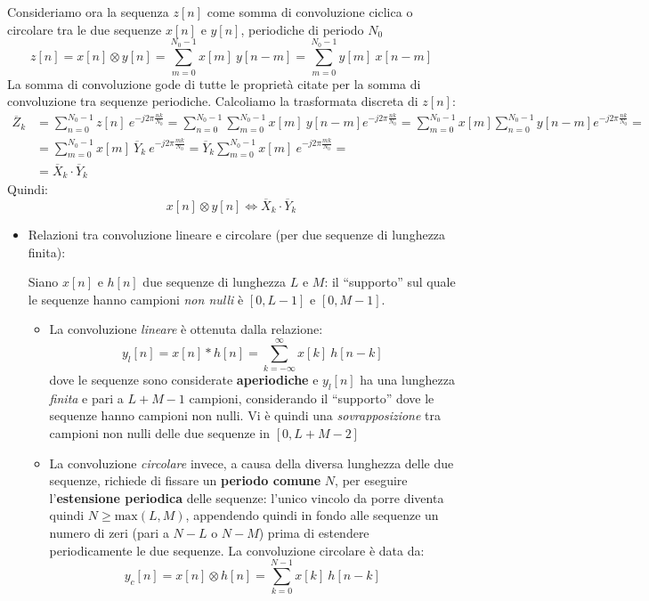 \documentclass[
]{article}
\providecommand{\tightlist}{%
  \setlength{\itemsep}{0pt}\setlength{\parskip}{0pt}}
\begin{document}
\begin{enumerate}
  Consideriamo ora la sequenza \(z[n]\) come somma di convoluzione
  ciclica o circolare tra le due sequenze \(x[n]\) e \(y[n]\),
  periodiche di periodo \(N_0\) \[
  z[n] = x[n] \otimes y[n] = \sum_{m=0}^{N_0 -1}x[m] \ y[n-m] = \sum_{m=0}^{N_0 -1}y[m] \ x[n-m]
  \] La somma di convoluzione gode di tutte le proprietà citate per la
  somma di convoluzione tra sequenze periodiche. \newline Calcoliamo la
  trasformata discreta di \(z[n]\): \begin{align*}
  \overline{Z}_k &= \sum_{n=0}^{N_0 -1} z[n] \ e^{-j2\pi{\frac{nk}{N_0}}} = \sum_{n=0}^{N_0 -1} \sum_{m=0}^{N_0 -1} x[m] \ y[n-m] e^{-j2\pi{\frac{nk}{N_0}}} = 
  \sum_{m=0}^{N_0 -1} x[m] \sum_{n=0}^{N_0 -1} y[n-m] e^{-j2\pi\frac{nk}{N_0}} = \\
  &= \sum_{m=0}^{N_0 -1} x[m] \ \overline{Y}_k \ e^{-j2\pi\frac{mk}{N_0}} = \overline{Y}_k \sum_{m=0}^{N_0 -1} x[m] \ e^{-j2\pi\frac{mk}{N_0}}= \\
  &= \overline{X}_k \cdot \overline{Y}_k
  \end{align*} Quindi: \[
  x[n]\otimes y[n] \Longleftrightarrow \overline{X}_k \cdot \overline{Y}_k
  \]

  \begin{itemize}
  \item
    Relazioni tra convoluzione lineare e circolare (per due sequenze di
    lunghezza finita):

    Siano \(x[n]\) e \(h[n]\) due sequenze di lunghezza \(L\) e \(M\):
    il ``supporto'' sul quale le sequenze hanno campioni \emph{non
    nulli} è \([0, L-1]\) e \([0, M-1]\).

    \begin{itemize}
    \tightlist
    \item
      La convoluzione \emph{lineare} è ottenuta dalla relazione: \[
        y_{l}[n] = x[n] * h[n] = \sum_{k=-\infty}^{\infty} x[k] \ h[n-k]
        \] dove le sequenze sono considerate \textbf{aperiodiche} e
      \(y_l[n]\) ha una lunghezza \emph{finita} e pari a \(L+M-1\)
      campioni, considerando il ``supporto'' dove le sequenze hanno
      campioni non nulli. Vi è quindi una \emph{sovrapposizione} tra
      campioni non nulli delle due sequenze in \([0, L+M-2]\)
    \item
      La convoluzione \emph{circolare} invece, a causa della diversa
      lunghezza delle due sequenze, richiede di fissare un
      \textbf{periodo comune} \(N\), per eseguire l'\textbf{estensione
      periodica} delle sequenze: l'unico vincolo da porre diventa quindi
      \(N \geq \text{max}(L,M)\), appendendo quindi in fondo alle
      sequenze un numero di zeri (pari a \(N-L\) o \(N-M\)) prima di
      estendere periodicamente le due sequenze. La convoluzione
      circolare è data da: \[
        y_{c}[n] = x[n] \otimes h[n] =\sum_{k=0}^{N-1}x[k] \ h[n-k]
        \]
    \end{itemize}
  \end{itemize}
\end{enumerate}
\end{document}
